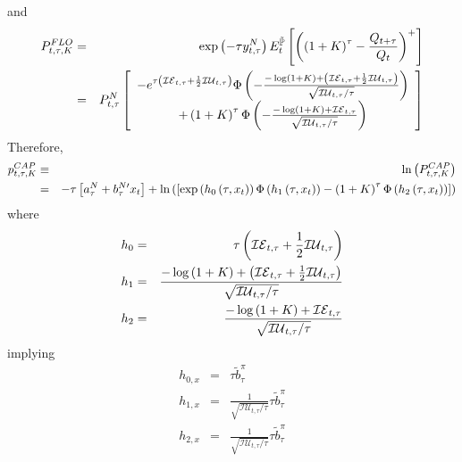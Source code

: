 \documentclass{article}
\begin{document}
and%
\begin{eqnarray*}
P_{t,\tau ,K}^{FLO} &=&\exp \left( -\tau y_{t,\tau }^{N}\right) E_{t}^{%
\mathbb{\tilde{P}}}\left[ \left( \left( 1+K\right) ^{\tau }-\frac{Q_{t+\tau }%
}{Q_{t}}\right) ^{+}\right]  \\
&=&P_{t,\tau }^{N}\left[ 
\begin{array}{c}
-e^{\tau \left( \mathcal{IE}_{t,\tau }+\frac{1}{2}\mathcal{IU}_{t,\tau
}\right) }\Phi \left( -\frac{-\log \left( 1+K\right) +\left( \mathcal{IE}%
_{t,\tau }+\frac{1}{2}\mathcal{IU}_{t,\tau }\right) }{\sqrt{\mathcal{IU}%
_{t,\tau }/\tau }}\right)  \\ 
+\left( 1+K\right) ^{\tau }\Phi \left( -\frac{-\log \left( 1+K\right) +%
\mathcal{IE}_{t,\tau }}{\sqrt{\mathcal{IU}_{t,\tau }/\tau }}\right) 
\end{array}%
\right] 
\end{eqnarray*}%
Therefore,%
\begin{eqnarray}
p_{t,\tau ,K}^{CAP} &\equiv &\ln \left( P_{t,\tau ,K}^{CAP}\right)   \notag
\\
&=&-\tau \left[ a_{\tau }^{N}+b_{\tau }^{N\prime }x_{t}\right] +\ln \left( %
\left[ \exp \left( h_{0}\left( \tau ,x_{t}\right) \right) \Phi \left(
h_{1}\left( \tau ,x_{t}\right) \right) -\left( 1+K\right) ^{\tau }\Phi
\left( h_{2}\left( \tau ,x_{t}\right) \right) \right] \right) 
\end{eqnarray}%
where%
\begin{eqnarray*}
h_{0} &=&\tau \left( \mathcal{IE}_{t,\tau }+\frac{1}{2}\mathcal{IU}_{t,\tau
}\right)  \\
h_{1} &=&\frac{-\log \left( 1+K\right) +\left( \mathcal{IE}_{t,\tau }+\frac{1%
}{2}\mathcal{IU}_{t,\tau }\right) }{\sqrt{\mathcal{IU}_{t,\tau }/\tau }} \\
h_{2} &=&\frac{-\log \left( 1+K\right) +\mathcal{IE}_{t,\tau }}{\sqrt{%
\mathcal{IU}_{t,\tau }/\tau }}
\end{eqnarray*}%
implying%
\begin{eqnarray*}
h_{0,x} &=&\tau \tilde{b}_{\tau }^{\pi } \\
h_{1,x} &=&\frac{1}{\sqrt{\mathcal{IU}_{t,\tau }/\tau }}\tau \tilde{b}_{\tau
}^{\pi } \\
h_{2,x} &=&\frac{1}{\sqrt{\mathcal{IU}_{t,\tau }/\tau }}\tau \tilde{b}_{\tau
}^{\pi }
\end{eqnarray*}
\end{document}
